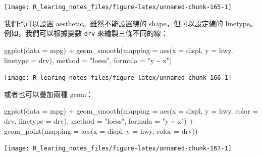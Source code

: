\documentclass[
]{book}
\newenvironment{Shaded}{\begin{snugshade}}{\end{snugshade}}
\newcommand{\AttributeTok}[1]{\textcolor[rgb]{0.77,0.63,0.00}{#1}}
\newcommand{\FunctionTok}[1]{\textcolor[rgb]{0.00,0.00,0.00}{#1}}
\newcommand{\NormalTok}[1]{#1}
\newcommand{\SpecialCharTok}[1]{\textcolor[rgb]{0.00,0.00,0.00}{#1}}
\newcommand{\StringTok}[1]{\textcolor[rgb]{0.31,0.60,0.02}{#1}}
\theoremstyle{definition}
\theoremstyle{remark}
\begin{document}
\begin{center}\texttt{[image: R\_learing\_notes\_files/figure-latex/unnamed-chunk-165-1]} \end{center}

我們也可以設置 aesthetic。雖然不能設置線的 shape，但可以設定線的 linetype。例如，我們可以根據變數 \texttt{drv} 來繪製三條不同的線：

\begin{Shaded}
\begin{Highlighting}[]
\FunctionTok{ggplot}\NormalTok{(}\AttributeTok{data =}\NormalTok{ mpg) }\SpecialCharTok{+} 
  \FunctionTok{geom\_smooth}\NormalTok{(}\AttributeTok{mapping =} \FunctionTok{aes}\NormalTok{(}\AttributeTok{x =}\NormalTok{ displ, }\AttributeTok{y =}\NormalTok{ hwy, }\AttributeTok{linetype =}\NormalTok{ drv),}
              \AttributeTok{method =} \StringTok{"loess"}\NormalTok{, }\AttributeTok{formula =} \StringTok{"y \textasciitilde{} x"}\NormalTok{)}
\end{Highlighting}
\end{Shaded}

\begin{center}\texttt{[image: R\_learing\_notes\_files/figure-latex/unnamed-chunk-166-1]} \end{center}

或者也可以疊加兩種 geom：

\begin{Shaded}
\begin{Highlighting}[]
\FunctionTok{ggplot}\NormalTok{(}\AttributeTok{data =}\NormalTok{ mpg) }\SpecialCharTok{+} 
  \FunctionTok{geom\_smooth}\NormalTok{(}\AttributeTok{mapping =} \FunctionTok{aes}\NormalTok{(}\AttributeTok{x =}\NormalTok{ displ, }\AttributeTok{y =}\NormalTok{ hwy, }\AttributeTok{color =}\NormalTok{ drv, }\AttributeTok{linetype =}\NormalTok{ drv),}
              \AttributeTok{method =} \StringTok{"loess"}\NormalTok{, }\AttributeTok{formula =} \StringTok{"y \textasciitilde{} x"}\NormalTok{) }\SpecialCharTok{+} 
  \FunctionTok{geom\_point}\NormalTok{(}\AttributeTok{mapping =} \FunctionTok{aes}\NormalTok{(}\AttributeTok{x =}\NormalTok{ displ, }\AttributeTok{y =}\NormalTok{ hwy, }\AttributeTok{color =}\NormalTok{ drv))}
\end{Highlighting}
\end{Shaded}

\begin{center}\texttt{[image: R\_learing\_notes\_files/figure-latex/unnamed-chunk-167-1]} \end{center}
\end{document}

